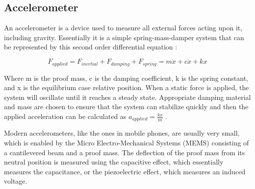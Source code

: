 \subsection{Accelerometer}
An accelerometer is a device used to measure all external forces acting upon it, including gravity. Essentially it is a simple spring-mass-damper system that can be represented by this second order differential equation \cite{dudek2008inertial}:

$$F_{applied} = F_{inertial} + F_{damping} + F_{spring} = m \ddot{x} + c \dot{x} + k x$$

Where m is the proof mass, c is the damping coefficient, k is the spring constant, and x is the equilibrium case relative position. When a static force is applied, the system will oscillate until it reaches a steady state. Appropriate damping material and mass are chosen to ensure that the system can stabilize quickly and then the applied acceleration can be calculated as $a_{applied} = \frac{kx}{m}$ .

Modern accelerometers, like the ones in mobile phones, are usually very small, which is enabled by the Micro Electro-Mechanical Systems (MEMS) consisting of a cantilevered beam and a proof mass. The deflection of the proof mass from its neutral position is measured using the capacitive effect, which essentially measures the capacitance, or the piezoelectric effect, which measures an induced voltage.

